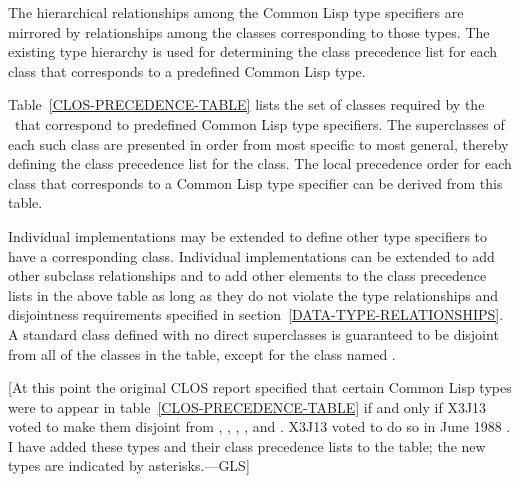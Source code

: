 The hierarchical relationships among the Common Lisp type specifiers
are mirrored by relationships among the classes corresponding to those
types.  The existing type hierarchy is used for determining the
class precedence list for each class that corresponds to a predefined
Common Lisp type.


Table~\ref{CLOS-PRECEDENCE-TABLE} lists the set of classes required by the \OS\
that correspond to predefined Common Lisp type specifiers.  The
superclasses of each such class are presented in order from most
specific to most general, thereby defining the class precedence list
for the class. The local precedence order for each class that
corresponds to a Common Lisp type specifier can be derived from this
table.

Individual implementations may be extended to define other type
specifiers to have a corresponding class.  Individual implementations
can be extended to add other subclass relationships and to add other
elements to the class precedence lists in the above table as long as
they do not violate the type relationships and disjointness
requirements specified in section~\ref{DATA-TYPE-RELATIONSHIPS}.
A standard class defined with no direct superclasses is guaranteed to
be disjoint from all of the classes in the table, except for the
class named \cdf{t}.

[At this point the original CLOS report specified that certain Common Lisp
types were to appear in table~\ref{CLOS-PRECEDENCE-TABLE} if and only if
X3J13 voted to make them disjoint from
, , , , and .
X3J13 voted to do so in June 1988
.  I have added these types
and their class precedence lists to the table; the new types are indicated
by asterisks.---GLS]

